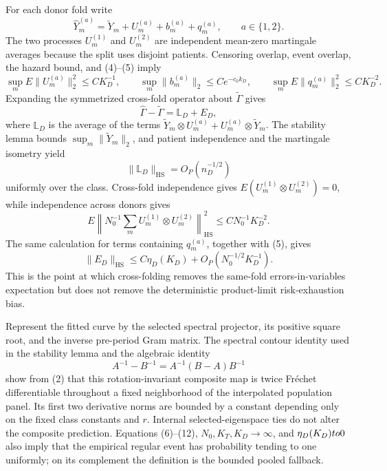 For each donor fold write
\[
 \widehat Y_m^{(a)}=\widetilde Y_m+U_m^{(a)}+b_m^{(a)}+q_m^{(a)},
 \qquad a\in\{1,2\}.                                        \tag{7}
\]
The two processes \(U_m^{(1)}\) and \(U_m^{(2)}\) are independent mean-zero
martingale averages because the split uses disjoint patients.  Censoring
overlap, event overlap, the hazard bound, and (4)--(5) imply
\[
 \sup_m E\|U_m^{(a)}\|_2^2\le CK_D^{-1},
 \qquad
 \sup_m\|b_m^{(a)}\|_2\le Ce^{-c_0k_D},
 \qquad
 \sup_m E\|q_m^{(a)}\|_2^2\le CK_D^{-2}.                   \tag{8}
\]
Expanding the symmetrized cross-fold operator about
\(\widetilde\Gamma\) gives
\[
 \widehat\Gamma-\widetilde\Gamma=\mathbb L_D+E_D,          \tag{9}
\]
where \(\mathbb L_D\) is the average of the terms
\(\widetilde Y_m\otimes U_m^{(a)}+U_m^{(a)}\otimes
\widetilde Y_m\).  The stability lemma bounds
\(\sup_m\|\widetilde Y_m\|_2\), and patient independence and the martingale
isometry yield
\[
 \|\mathbb L_D\|_{\mathrm{HS}}=O_P(n_D^{-1/2})              \tag{10}
\]
uniformly over the class.  Cross-fold independence gives
\(E(U_m^{(1)}\otimes U_m^{(2)})=0\), while independence across donors gives
\[
 E\left\|N_0^{-1}\sum_mU_m^{(1)}\otimes U_m^{(2)}
   \right\|_{\mathrm{HS}}^2
 \le C N_0^{-1}K_D^{-2}.                                   \tag{11}
\]
The same calculation for terms containing \(q_m^{(a)}\), together with
(5), gives
\[
 \|E_D\|_{\mathrm{HS}}
 \le C\eta_D(K_D)+O_P(N_0^{-1/2}K_D^{-1}).                 \tag{12}
\]
This is the point at which cross-folding removes the same-fold
errors-in-variables expectation but does not remove the deterministic
product-limit risk-exhaustion bias.

Represent the fitted curve by the selected spectral projector, its positive
square root, and the inverse pre-period Gram matrix.  The spectral contour
identity used in the stability lemma and the algebraic identity
\[
 A^{-1}-B^{-1}=A^{-1}(B-A)B^{-1}                             \tag{13}
\]
show from (2) that this rotation-invariant composite map is twice
Fr\'echet differentiable throughout a fixed neighborhood of the
interpolated population panel.  Its first two derivative norms are bounded
by a constant depending only on the fixed class constants and \(r\).
Internal selected-eigenspace ties do not alter the composite prediction.
Equations (6)--(12), \(N_0,K_T,K_D\to\infty\), and
\(\eta_D(K_D)\\to0\) also imply that the empirical regular event has
probability tending to one uniformly; on its complement the definition is
the bounded pooled fallback.

